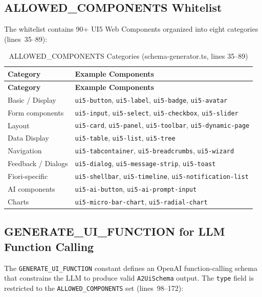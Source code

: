 \documentclass[11pt]{article}
\begin{document}
\subsection{ALLOWED\_COMPONENTS Whitelist}

The whitelist contains 90+ UI5 Web Components organized into eight categories
(lines~35--89):

\begin{longtable}{@{}ll@{}}
\caption{ALLOWED\_COMPONENTS Categories (schema-generator.ts, lines 35--89)} \\
\toprule
\textbf{Category} & \textbf{Example Components} \\
\midrule
\endfirsthead
\toprule
\textbf{Category} & \textbf{Example Components} \\
\midrule
\endhead
Basic / Display & \texttt{ui5-button}, \texttt{ui5-label}, \texttt{ui5-badge}, \texttt{ui5-avatar} \\
Form components & \texttt{ui5-input}, \texttt{ui5-select}, \texttt{ui5-checkbox}, \texttt{ui5-slider} \\
Layout & \texttt{ui5-card}, \texttt{ui5-panel}, \texttt{ui5-toolbar}, \texttt{ui5-dynamic-page} \\
Data Display & \texttt{ui5-table}, \texttt{ui5-list}, \texttt{ui5-tree} \\
Navigation & \texttt{ui5-tabcontainer}, \texttt{ui5-breadcrumbs}, \texttt{ui5-wizard} \\
Feedback / Dialogs & \texttt{ui5-dialog}, \texttt{ui5-message-strip}, \texttt{ui5-toast} \\
Fiori-specific & \texttt{ui5-shellbar}, \texttt{ui5-timeline}, \texttt{ui5-notification-list} \\
AI components & \texttt{ui5-ai-button}, \texttt{ui5-ai-prompt-input} \\
Charts & \texttt{ui5-micro-bar-chart}, \texttt{ui5-radial-chart} \\
\bottomrule
\end{longtable}

\subsection{GENERATE\_UI\_FUNCTION for LLM Function Calling}

The \texttt{GENERATE\_UI\_FUNCTION} constant defines an OpenAI function-calling
schema that constrains the LLM to produce valid \texttt{A2UiSchema} output.
The \texttt{type} field is restricted to the \texttt{ALLOWED\_COMPONENTS} set
(lines~98--172):
\end{document}
